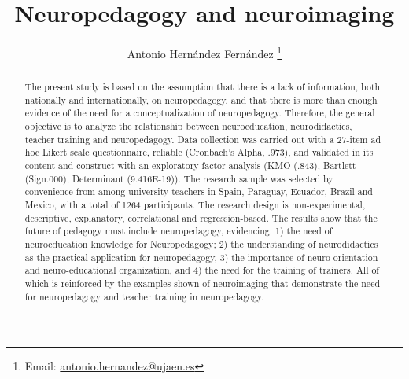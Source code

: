 \documentclass[english]{textolivre}
\title{Neuropedagogy and neuroimaging}
\author[1]{Antonio Hernández Fernández \orcid{0000-0002-7807-4363} \thanks{Email: \href{mailto:antonio.hernandez@ujaen.es}{antonio.hernandez@ujaen.es}}}
\affil[1]{Universidad de Jaén, Facultad de Humanidades y Ciencias de la Educación, Departamento Pedagogía, Jaén, España.}
\begin{document}
\maketitle

\begin{polyabstract}
\begin{abstract}
The present study is based on the assumption that there is a lack of information, both nationally and internationally, on neuropedagogy, and that there is more than enough evidence of the need for a conceptualization of neuropedagogy. Therefore, the general objective is to analyze the relationship between neuroeducation, neurodidactics, teacher training and neuropedagogy. Data collection was carried out with a 27-item ad hoc Likert scale questionnaire, reliable (Cronbach's Alpha, .973), and validated in its content and construct with an exploratory factor analysis (KMO (.843), Bartlett (Sign.000), Determinant (9.416E-19)). The research sample was selected by convenience from among university teachers in Spain, Paraguay, Ecuador, Brazil and Mexico, with a total of 1264 participants. The research design is non-experimental, descriptive, explanatory, correlational and regression-based. The results show that the future of pedagogy must include neuropedagogy, evidencing: 1) the need of neuroeducation knowledge for Neuropedagogy; 2) the understanding of neurodidactics as the practical application for neuropedagogy, 3) the importance of neuro-orientation and neuro-educational organization, and 4) the need for the training of trainers. All of which is reinforced by the examples shown of neuroimaging that demonstrate the need for neuropedagogy and teacher training in neuropedagogy.

\end{abstract}


\end{polyabstract}
\end{document}
